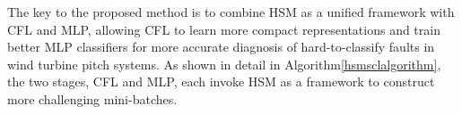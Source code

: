 \documentclass[lettersize,journal]{IEEEtran}
\begin{document}
The key to the proposed method is to combine HSM as a unified framework with CFL and MLP, allowing CFL to learn more compact representations and train better MLP classifiers for more accurate diagnosis of hard-to-classify faults in wind turbine pitch systems. As shown in detail in Algorithm\ref{hsmsclalgorithm}, the two stages, CFL and MLP, each invoke HSM as a framework to construct more challenging mini-batches.

\end{document}
